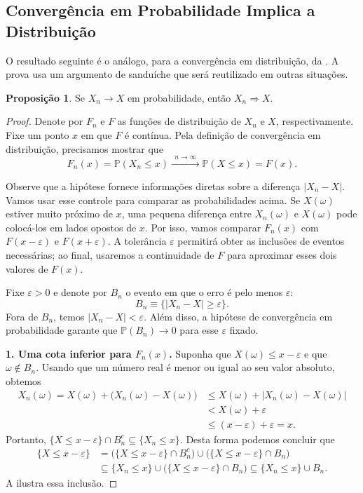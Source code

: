 \documentclass[12pt,portuguese]{article}
\theoremstyle{definition}
\newtheorem{proposition}[proposition]{Proposição}
\theoremstyle{plainexercise}
\theoremstyle{starredexercise}
\theoremstyle{definition}
\begin{document}
\subsection{Convergência em Probabilidade Implica a Distribuição}
\label{subsec:prob-implies-dist}

O resultado seguinte é o análogo, para a convergência em distribuição, da
. A prova usa um argumento de sanduíche que será
reutilizado em outras situações.

\begin{proposition}\label{prop:prob-implies-dist}
Se $X_n\to X$ em probabilidade, então $X_n\Rightarrow X$.
\end{proposition}

\begin{proof}
Denote por $F_n$ e $F$ as funções de distribuição de $X_n$ e $X$,
respectivamente. Fixe um ponto $x$ em que $F$ é contínua. Pela definição de
convergência em distribuição, precisamos mostrar que
\[
F_n(x)=\mathbb{P}(X_n\leqslant x)
\xrightarrow{\ \ n\to\infty\ \ }
\mathbb{P}(X\leqslant x)=F(x).
\]

Observe que a hipótese fornece informações diretas sobre a diferença $|X_n-X|$. 
Vamos usar esse controle para
comparar as probabilidades acima. Se $X(\omega)$ estiver muito próximo de
$x$, uma pequena diferença entre $X_n(\omega)$ e $X(\omega)$ pode colocá-los
em lados opostos de $x$. Por isso, vamos comparar $F_n(x)$ com $F(x-\varepsilon)$
e $F(x+\varepsilon)$. A tolerância $\varepsilon$ permitirá obter as inclusões de
eventos necessárias; ao final, usaremos a continuidade de $F$ para aproximar
esses dois valores de $F(x)$.

Fixe $\varepsilon>0$ e denote por $B_n$ o evento em que o erro é pelo menos
$\varepsilon$:
\[
B_n\equiv\{|X_n-X|\geqslant\varepsilon\}.
\]
Fora de $B_n$, temos $|X_n-X|<\varepsilon$. Além disso, a hipótese de
convergência em probabilidade garante que $\mathbb{P}(B_n)\to0$ para esse
$\varepsilon$ fixado.

\smallskip
\noindent\textbf{1. Uma cota inferior para $F_n(x)$.}
Suponha que $X(\omega)\leqslant x-\varepsilon$ e que $\omega\notin B_n$.
Usando que um número real é menor ou igual ao seu valor absoluto, obtemos
\begin{align*}
X_n(\omega)
=X(\omega)+\bigl(X_n(\omega)-X(\omega)\bigr)
&\leqslant X(\omega)+|X_n(\omega)-X(\omega)|
\\
&<X(\omega)+\varepsilon
\\
&\leqslant(x-\varepsilon)+\varepsilon=x.
\end{align*}
Portanto, $\{X\leqslant x-\varepsilon\}\cap B_n^c \subseteq \{X_n\leqslant x\}$. 
Desta forma podemos concluir que 
\begin{align*}
\{X\leqslant x-\varepsilon\}
&=
\bigl(\{X\leqslant x-\varepsilon\}\cap B_n^c \bigr) \cup \bigl(\{X\leqslant x-\varepsilon\}\cap B_n \bigr)
\\[0.2cm]
&\subseteq
\{X_n\leqslant x\}\cup \bigl(\{X\leqslant x-\varepsilon\}\cap B_n \bigr)  \subseteq \{X_n\leqslant x\}\cup B_n.
\end{align*}
A  ilustra essa inclusão.


\end{proof}
\end{document}
